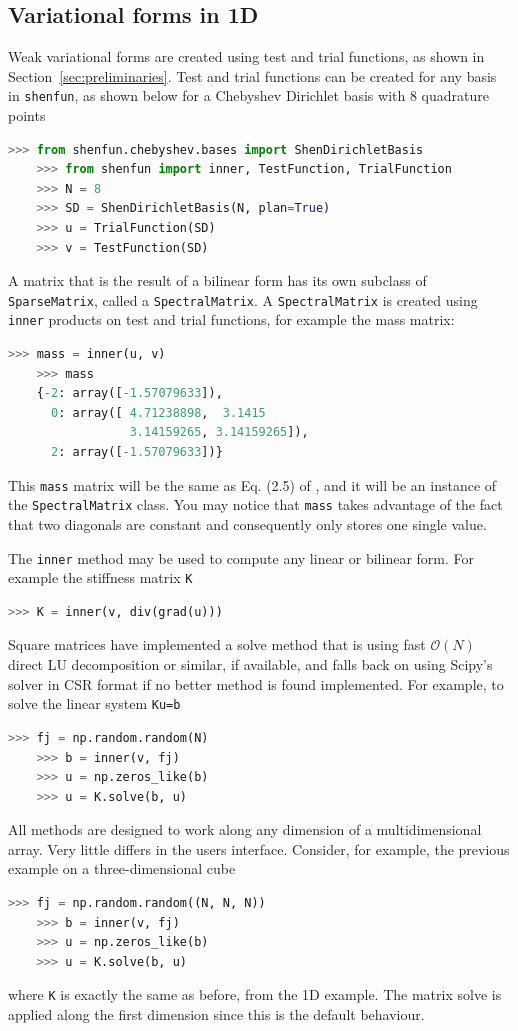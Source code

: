 \documentclass[%
oneside,                 %
final,                   %
10pt]{article}
\begin{document}
\subsection{Variational forms in 1D}
Weak variational forms are created using test and trial functions, as shown in Section~\ref{sec:preliminaries}. Test and trial functions can be created for any basis in \texttt{shenfun}, as shown below for a Chebyshev Dirichlet basis with 8 quadrature points
\begin{lstlisting}[language=Python,style=yellow2_fb]
    >>> from shenfun.chebyshev.bases import ShenDirichletBasis
    >>> from shenfun import inner, TestFunction, TrialFunction    
    >>> N = 8
    >>> SD = ShenDirichletBasis(N, plan=True)
    >>> u = TrialFunction(SD)
    >>> v = TestFunction(SD)
\end{lstlisting}
A matrix that is the result of a bilinear form has its own subclass of \texttt{SparseMatrix}, called a \texttt{SpectralMatrix}. A \texttt{SpectralMatrix} is created using \texttt{inner} products on test and trial functions, for example the mass matrix:
\begin{lstlisting}[language=Python,style=yellow2_fb]
    >>> mass = inner(u, v)
    >>> mass
    {-2: array([-1.57079633]),
      0: array([ 4.71238898,  3.1415
                 3.14159265, 3.14159265]),
      2: array([-1.57079633])}
\end{lstlisting}
This \texttt{mass} matrix will be the same as Eq. (2.5) of \cite{shen95}, and it will be an instance of the \texttt{SpectralMatrix} class.
You may notice that \texttt{mass} takes advantage of the fact that two diagonals are constant and consequently only stores one single value.

The \texttt{inner} method may be used to compute any linear or bilinear form. For example the stiffness matrix \texttt{K}
\begin{lstlisting}[language=Python,style=yellow2_fb]
    >>> K = inner(v, div(grad(u)))
\end{lstlisting}
Square matrices have implemented a solve method that is using fast $\mathcal{O}(N)$ direct LU decomposition or similar, if available, and falls back on using Scipy's solver in CSR format if no better method is found implemented. For example, to solve the linear system \texttt{Ku=b}
\begin{lstlisting}[language=Python,style=yellow2_fb]
    >>> fj = np.random.random(N)
    >>> b = inner(v, fj)
    >>> u = np.zeros_like(b)
    >>> u = K.solve(b, u)
\end{lstlisting}
All methods are designed to work along any dimension of a multidimensional array. Very little differs in the users interface. Consider, for example, the previous example on a three-dimensional cube 
\begin{lstlisting}[language=Python,style=yellow2_fb]
    >>> fj = np.random.random((N, N, N))
    >>> b = inner(v, fj)
    >>> u = np.zeros_like(b)
    >>> u = K.solve(b, u)
\end{lstlisting}
where \texttt{K} is exactly the same as before, from the 1D example. The matrix solve is applied along the first dimension since this is the default behaviour.
\end{document}
